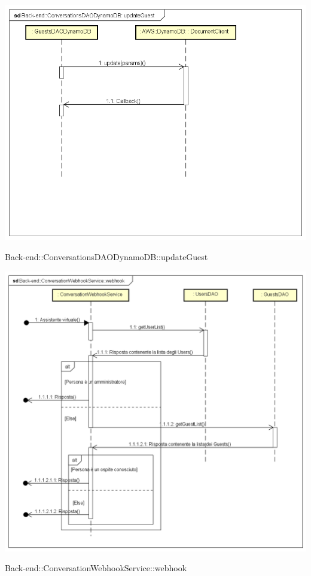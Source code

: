 \includegraphics[width=\textwidth,height=\textheight,keepaspectratio]{images/diagrams/back-end/Ufficial_Backend/Back-end__ConversationsDAODynamoDB__updateGuest.png} 	\caption{Back-end::ConversationsDAODynamoDB::updateGuest}
\includegraphics[width=\textwidth,height=\textheight,keepaspectratio]{images/diagrams/back-end/Ufficial_Backend/Back-end__ConversationWebhookService__webhook.png} 	\caption{Back-end::ConversationWebhookService::webhook}

